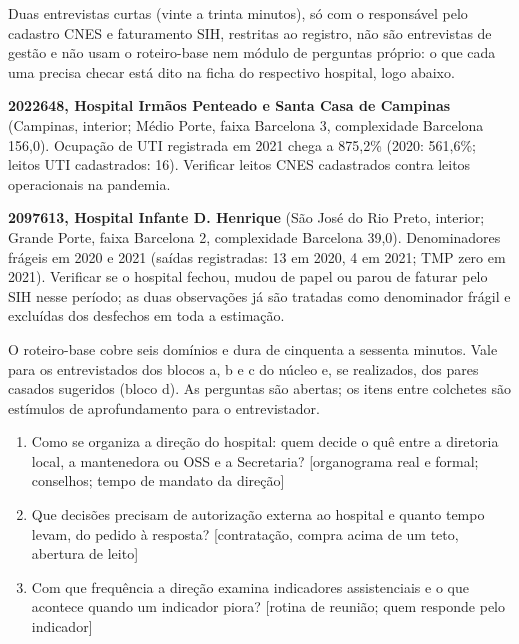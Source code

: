 Duas entrevistas curtas (vinte a trinta minutos), só com o responsável
pelo cadastro CNES e faturamento SIH, restritas ao registro, não são
entrevistas de gestão e não usam o roteiro-base nem módulo de perguntas
próprio: o que cada uma precisa checar está dito na ficha do respectivo
hospital, logo abaixo.

\noindent\textbf{2022648, Hospital Irmãos Penteado e Santa Casa de Campinas} (Campinas, interior; Médio Porte, faixa Barcelona 3, complexidade Barcelona 156,0). Ocupação de UTI registrada em 2021 chega a 875,2\% (2020: 561,6\%; leitos UTI cadastrados: 16). Verificar leitos CNES cadastrados contra leitos operacionais na pandemia.\par\medskip
\noindent\textbf{2097613, Hospital Infante D. Henrique} (São José do Rio Preto, interior; Grande Porte, faixa Barcelona 2, complexidade Barcelona 39,0). Denominadores frágeis em 2020 e 2021 (saídas registradas: 13 em 2020, 4 em 2021; TMP zero em 2021). Verificar se o hospital fechou, mudou de papel ou parou de faturar pelo SIH nesse período; as duas observações já são tratadas como denominador frágil e excluídas dos desfechos em toda a estimação.\par\medskip


O roteiro-base cobre seis domínios e dura de cinquenta a sessenta
minutos. Vale para os entrevistados dos blocos a, b e c do núcleo e, se
realizados, dos pares casados sugeridos (bloco d). As
perguntas são abertas; os itens entre colchetes são estímulos de
aprofundamento para o entrevistador.

\begin{enumerate}[itemsep=2pt]
  \item Como se organiza a direção do hospital: quem decide o quê entre a diretoria local, a mantenedora ou OSS e a Secretaria? [organograma real e formal; conselhos; tempo de mandato da direção]
  \par\nopagebreak{}
  \item Que decisões precisam de autorização externa ao hospital e quanto tempo levam, do pedido à resposta? [contratação, compra acima de um teto, abertura de leito]
  \par\nopagebreak{}
  \item Com que frequência a direção examina indicadores assistenciais e o que acontece quando um indicador piora? [rotina de reunião; quem responde pelo indicador]
  \par\nopagebreak{}
\end{enumerate}


